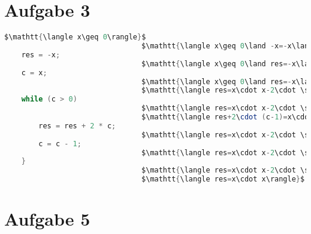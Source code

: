 \documentclass[a4paper,11pt]{scrartcl}
\begin{document}
\section*{Aufgabe 3}

	\begin{lstlisting}[mathescape=true, language=java]
								$\mathtt{\langle x\geq 0\rangle}$
								$\mathtt{\langle x\geq 0\land -x=-x\land x=x\rangle}$
	res = -x;
								$\mathtt{\langle x\geq 0\land res=-x\land x=x\rangle}$
	c = x;
								$\mathtt{\langle x\geq 0\land res=-x\land c=x\rangle}$
								$\mathtt{\langle res=x\cdot x-2\cdot \sum_{k=0}^{c}k\land c\geq 0\rangle}$
	while (c > 0)
								$\mathtt{\langle res=x\cdot x-2\cdot \sum_{k=0}^{c}k\land c\geq 0\land c>0\rangle}$
								$\mathtt{\langle res+2\cdot (c-1)=x\cdot x-2\cdot \sum_{k=0}^{(c-1)}k\land (c-1)\geq 0\rangle}$	
		res = res + 2 * c;
								$\mathtt{\langle res=x\cdot x-2\cdot \sum_{k=0}^{(c-1)}k\land (c-1)\geq 0\rangle}$	
		c = c - 1;
								$\mathtt{\langle res=x\cdot x-2\cdot \sum_{k=0}^{c}k\land c\geq 0\rangle}$				
	}
								$\mathtt{\langle res=x\cdot x-2\cdot \sum_{k=0}^{c}k\land c\geq 0\land \neg (c>0)\rangle}$								
								$\mathtt{\langle res=x\cdot x\rangle}$								
	\end{lstlisting}


\section*{Aufgabe 5}
\end{document}
